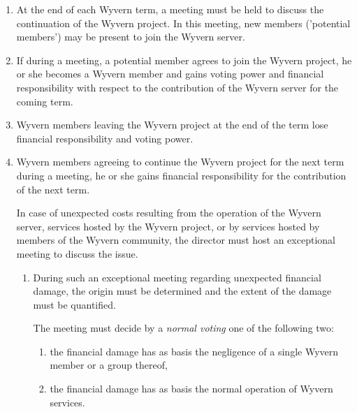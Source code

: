 \begin{enumerate}
    
    \item At the end of each Wyvern term, a meeting must be held to discuss the continuation of the Wyvern project. In this meeting, new members ('potential members') may be present to join the Wyvern server.

    \item If during a meeting, a potential member agrees to join the Wyvern project, he or she becomes a Wyvern member and gains voting power and financial responsibility with respect to the contribution of the Wyvern server for the coming term.
    
    \item Wyvern members leaving the Wyvern project at the end of the term lose financial responsibility and voting power.
    
    \item Wyvern members agreeing to continue the Wyvern project for the next term during a meeting, he or she gains financial responsibility for the contribution of the next term.
    
    \begin{item}
         In case of unexpected costs resulting from the operation of the Wyvern server, services hosted by the Wyvern project, or by services hosted by members of the Wyvern community, the director must host an exceptional meeting to discuss the issue.
        
        \begin{enumerate}
            \item During such an exceptional meeting regarding unexpected financial damage, the origin must be determined and the extent of the damage must be quantified.

            \begin{item}
                The meeting must decide by a \emph{normal voting} one of the following two: 
                
                \begin{enumerate}
                    \item the financial damage has as basis the negligence of a single Wyvern member or a group thereof,
                    \item the financial damage has as basis the normal operation of Wyvern services.
                \end{enumerate}
            \end{item}
        

\end{enumerate}
\end{item}
\end{enumerate}
